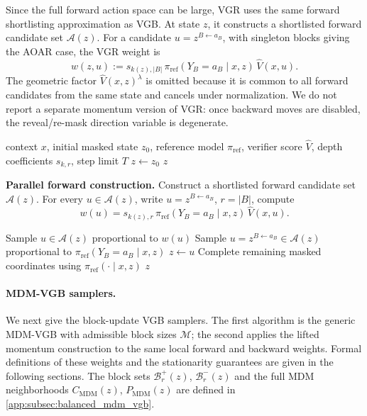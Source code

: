 \documentclass{article}
\numberwithin{theorem}{section}
\numberwithin{proposition}{section}
\numberwithin{corollary}{section}
\numberwithin{lemma}{section}
\numberwithin{conjecture}{section}
\numberwithin{remark}{section}
\numberwithin{definition}{section}
\numberwithin{assumption}{section}
\numberwithin{example}{section}
\newcommand{\calB}{{\mathcal{B}}}
\newcommand{\calM}{{\mathcal{M}}}
\newcommand{\calY}{{\mathcal{Y}}}
\providecommand{\base}{\pi_{\mathrm{ref}}}
\begin{document}
Since the full forward action space can be large, \textsc{VGR} uses the same
forward shortlisting approximation as VGB. At state $z$, it constructs a
shortlisted forward candidate set $\mathcal A(z)$. For a candidate
$u=z^{B\leftarrow a_B}$, with singleton blocks giving the AOAR case, the
\textsc{VGR} weight is
\begin{equation*}
    w(z,u)
    :=
    s_{k(z),|B|}\,
    \base(Y_B=a_B\mid x,z)\,
    \widehat V(x,u).
\end{equation*}
The geometric factor $\widehat V(x,z)^\lambda$ is omitted because it is common
to all forward candidates from the same state and cancels under normalization.
We do not report a separate momentum version of \textsc{VGR}: once backward
moves are disabled, the reveal/re-mask direction variable is degenerate.
\begin{algorithm}[h!]
\caption[Value-guided rollout (VGR)]{Value-guided rollout (VGR)
(\protect{} = parallelizable area)}
\label{alg:vgr}
\begin{algorithmic}[1]
\Require context $x$, initial masked state $z_0$, reference model $\base$, verifier score $\widehat V$, depth coefficients $s_{k,r}$, step limit $T$
\State $z\gets z_0$
    \If{$z\in\calY$}
        \State \Return $z$
    \EndIf
    \Statex \hspace*{\algorithmicindent}\colorbox{Lavender!25}{
    \parbox{0.86\linewidth}{
    \textbf{Parallel forward construction.}
    Construct a shortlisted forward candidate set $\mathcal A(z)$. For every
    $u\in\mathcal A(z)$, write $u=z^{B\leftarrow a_B}$,
    $r=|B|$, compute
    \begin{equation*}
        w(u)
        =
        s_{k(z),r}\,
        \base(Y_B=a_B\mid x,z)\,
        \widehat V(x,u).
    \end{equation*}}}
        \State Sample $u\in\mathcal A(z)$ proportional to $w(u)$
    \Else
        \State Sample $u=z^{B\leftarrow a_B}\in\mathcal A(z)$ proportional to $\base(Y_B=a_B\mid x,z)$
    \EndIf
    \State $z\gets u$
\EndFor
\If{$z\notin\calY$}
    \State Complete remaining masked coordinates using $\base(\cdot\mid x,z)$
\EndIf
\State \Return $z$
\end{algorithmic}
\end{algorithm}

\paragraph{MDM-VGB samplers.}
We next give the block-update VGB samplers. The first
algorithm is the generic MDM-VGB with admissible block sizes
$\calM$; the second applies the lifted momentum construction to the same
local forward and backward weights. Formal definitions of these weights and the
stationarity guarantees are given in the following sections. The block sets \(\calB_r^+(z)\), \(\calB_r^-(z)\) and the full MDM neighborhoods \(C_{\mathrm{MDM}}(z)\), \(P_{\mathrm{MDM}}(z)\) are defined in \cref{app:subsec:balanced_mdm_vgb}.
\end{document}
